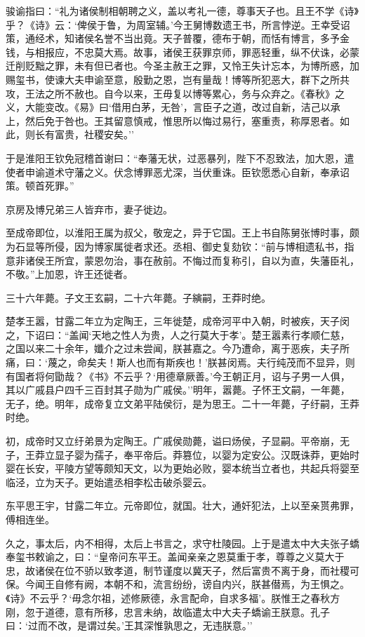 \documentclass[]{article}
\begin{document}
骏谕指曰：``礼为诸侯制相朝聘之义，盖以考礼一德，尊事天子也。且王不学《诗》乎？《诗》云：`俾侯于鲁，为周室辅。'今王舅博数遗王书，所言悖逆。王幸受诏策，通经术，知诸侯名誉不当出竟。天子普覆，德布于朝，而恬有博言，多予金钱，与相报应，不忠莫大焉。故事，诸侯王获罪京师，罪恶轻重，纵不伏诛，必蒙迁削贬黜之罪，未有但已者也。今圣主赦王之罪，又怜王失计忘本，为博所惑，加赐玺书，使谏大夫申谕至意，殷勤之恩，岂有量哉！博等所犯恶大，群下之所共攻，王法之所不赦也。自今以来，王毋复以博等累心，务与众弃之。《春秋》之义，大能变改。《易》曰`借用白茅，无咎'，言臣子之道，改过自新，洁己以承上，然后免于咎也。王其留意慎戒，惟思所以悔过易行，塞重责，称厚恩者。如此，则长有富贵，社稷安矣。''

于是淮阳王钦免冠稽首谢曰：``奉藩无状，过恶暴列，陛下不忍致法，加大恩，遣使者申谕道术守藩之义。伏念博罪恶尤深，当伏重诛。臣钦愿悉心自新，奉承诏策。顿首死罪。''

京房及博兄弟三人皆弃市，妻子徙边。

至成帝即位，以淮阳王属为叔父，敬宠之，异于它国。王上书自陈舅张博时事，颇为石显等所侵，因为博家属徙者求还。丞相、御史复劾钦：``前与博相遗私书，指意非诸侯王所宜，蒙恩勿治，事在赦前。不悔过而复称引，自以为直，失藩臣礼，不敬。''上加恩，许王还徙者。

三十六年薨。子文王玄嗣，二十六年薨。子縯嗣，王莽时绝。

楚孝王嚣，甘露二年立为定陶王，三年徙楚，成帝河平中入朝，时被疾，天子闵之，下诏曰：``盖闻`天地之性人为贵，人之行莫大于孝'。楚王嚣素行孝顺仁慈，之国以来二十余年，孅介之过未尝闻，朕甚嘉之。今乃遭命，离于恶疾，夫子所痛，曰：`蔑之，命矣夫！斯人也而有斯疾也！'朕甚闵焉。夫行纯茂而不显异，则有国者将何勖哉？《书》不云乎？`用德章厥善。'今王朝正月，诏与子男一人俱，其以广戚县户四千三百封其子勋为广戚侯。''明年，嚣薨。子怀王文嗣，一年薨，无子，绝。明年，成帝复立文弟平陆侯衍，是为思王。二十一年薨，子纡嗣，王莽时绝。

初，成帝时又立纡弟景为定陶王。广戚侯勋薨，谥曰炀侯，子显嗣。平帝崩，无子，王莽立显子婴为孺子，奉平帝后。莽篡位，以婴为定安公。汉既诛莽，更始时婴在长安，平陵方望等颇知天文，以为更始必败，婴本统当立者也，共起兵将婴至临泾，立为天子。更始遣丞相李松击破杀婴云。

东平思王宇，甘露二年立。元帝即位，就国。壮大，通奸犯法，上以至亲贳弗罪，傅相连坐。

久之，事太后，内不相得，太后上书言之，求守杜陵园。上于是遣太中大夫张子蟜奉玺书敕谕之，曰：``皇帝问东平王。盖闻亲亲之恩莫重于孝，尊尊之义莫大于忠，故诸侯在位不骄以致孝道，制节谨度以冀天子，然后富贵不离于身，而社稷可保。今闻王自修有阙，本朝不和，流言纷纷，谤自内兴，朕甚僣焉，为王惧之。《诗》不云乎？`毋念尔祖，述修厥德，永言配命，自求多福'。朕惟王之春秋方刚，忽于道德，意有所移，忠言未纳，故临遣太中大夫子蟜谕王朕意。孔子曰：`过而不改，是谓过矣。'王其深惟孰思之，无违朕意。''
\end{document}
